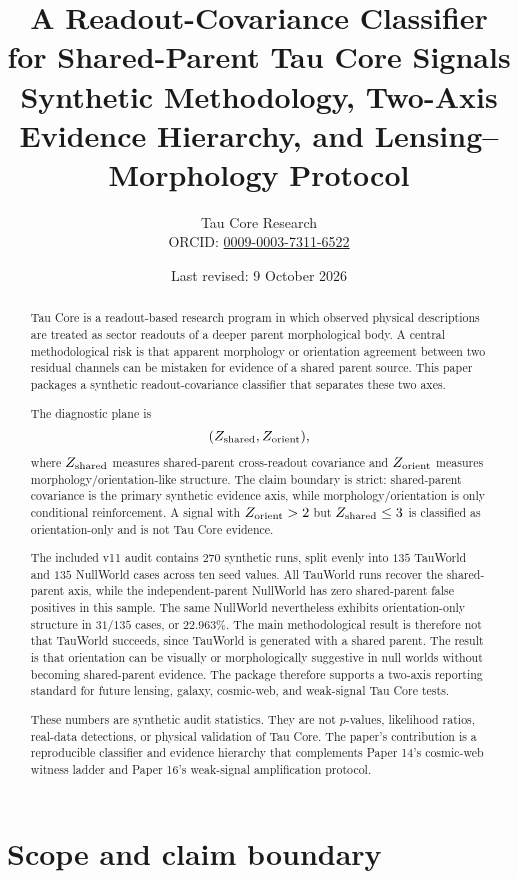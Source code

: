 \documentclass[12pt]{article}
\title{\textbf{A Readout-Covariance Classifier for Shared-Parent Tau Core Signals}\\
\large Synthetic Methodology, Two-Axis Evidence Hierarchy, and Lensing--Morphology Protocol}
\author{Tau Core Research\\{\small ORCID: \href{https://orcid.org/0009-0003-7311-6522}{0009-0003-7311-6522}}}
\date{Last revised: 9 October 2026}
\begin{document}
\maketitle

\begin{abstract}
Tau Core is a readout-based research program in which observed physical
descriptions are treated as sector readouts of a deeper parent morphological
body.  A central methodological risk is that apparent morphology or orientation
agreement between two residual channels can be mistaken for evidence of a
shared parent source.  This paper packages a synthetic readout-covariance
classifier that separates these two axes.

The diagnostic plane is
\[
  (Z_{\rm shared},Z_{\rm orient}),
\]
where \(Z_{\rm shared}\) measures shared-parent cross-readout covariance and
\(Z_{\rm orient}\) measures morphology/orientation-like structure.  The claim
boundary is strict: shared-parent covariance is the primary synthetic evidence
axis, while morphology/orientation is only conditional reinforcement.  A signal
with \(Z_{\rm orient}>2\) but \(Z_{\rm shared}\leq3\) is classified as
orientation-only and is not Tau Core evidence.

The included v11 audit contains \(270\) synthetic runs, split evenly into
\(135\) TauWorld and \(135\) NullWorld cases across ten seed values.  All
TauWorld runs recover the shared-parent axis, while the independent-parent
NullWorld has zero shared-parent false positives in this sample.  The same
NullWorld nevertheless exhibits orientation-only structure in \(31/135\) cases,
or \(22.963\%\).  The main methodological result is therefore not that TauWorld
succeeds, since TauWorld is generated with a shared parent.  The result is that
orientation can be visually or morphologically suggestive in null worlds
without becoming shared-parent evidence.  The package therefore supports a
two-axis reporting standard for future lensing, galaxy, cosmic-web, and
weak-signal Tau Core tests.

These numbers are synthetic audit statistics.  They are not \(p\)-values,
likelihood ratios, real-data detections, or physical validation of Tau Core.
The paper's contribution is a reproducible classifier and evidence hierarchy
that complements Paper 14's cosmic-web witness ladder and Paper 16's
weak-signal amplification protocol.
\end{abstract}

\tableofcontents

\section{Scope and claim boundary}
\end{document}
